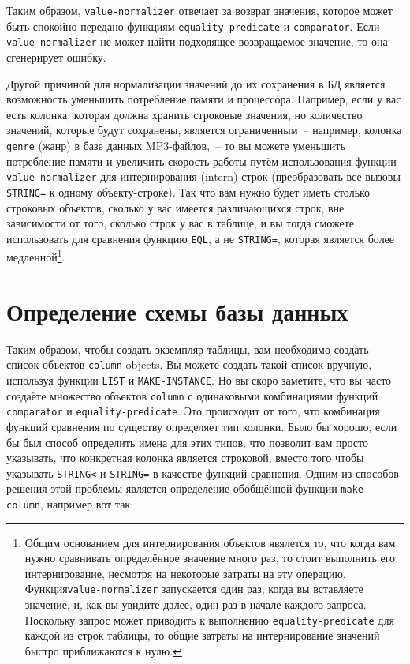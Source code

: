 Таким образом, \lstinline{value-normalizer} отвечает за возврат значения, которое может быть
спокойно передано функциям \lstinline{equality-predicate} и \lstinline{comparator}.  Если
\lstinline{value-normalizer} не может найти подходящее возвращаемое значение, то она
сгенерирует ошибку.

Другой причиной для нормализации значений до их сохранения в БД является возможность
уменьшить потребление памяти и процессора.  Например, если у вас есть колонка, которая
должна хранить строковые значения, но количество значений, которые будут сохранены,
является ограниченным~-- например, колонка \lstinline{genre} (жанр) в базе данных
MP3-файлов,~-- то вы можете уменьшить потребление памяти и увеличить скорость работы путём
использования функции \lstinline{value-normalizer} для интернирования (intern) строк
(преобразовать все вызовы \lstinline{STRING=} к одному объекту-строке).  Так что вам нужно
будет иметь столько строковых объектов, сколько у вас имеется различающихся строк, вне
зависимости от того, сколько строк у вас в таблице, и вы тогда сможете использовать для
сравнения функцию \lstinline{EQL}, а не \lstinline{STRING=}, которая является более
медленной\footnote{Общим основанием для интернирования объектов явялется то, что когда вам
  нужно сравнивать определённое значение много раз, то стоит выполнить его интернирование,
  несмотря на некоторые затраты на эту операцию.  Функция\lstinline{value-normalizer}
  запускается один раз, когда вы вставляете значение, и, как вы увидите далее, один раз в
  начале каждого запроса. Поскольку запрос может приводить к выполнению
  \lstinline{equality-predicate} для каждой из строк таблицы, то общие затраты на
  интернирование значений быстро приближаются к нулю.}.

\section{Определение схемы базы данных}

Таким образом, чтобы создать экземпляр таблицы, вам необходимо создать список объектов
\lstinline{column} objects.  Вы можете создать такой список вручную, используя функции
\lstinline{LIST} и \lstinline{MAKE-INSTANCE}.  Но вы скоро заметите, что вы часто создаёте множество
объектов \lstinline{column} с одинаковыми комбинациями функций \lstinline{comparator} и
\lstinline{equality-predicate}. Это происходит от того, что комбинация функций сравнения по
существу определяет тип колонки. Было бы хорошо, если бы был способ определить имена для
этих типов, что позволит вам просто указывать, что конкретная колонка является строковой,
вместо того чтобы указывать \lstinline{STRING<} и \lstinline{STRING=} в качестве функций сравнения.
Одним из способов решения этой проблемы является определение обобщённой функции
\lstinline{make-column}, например вот так:

